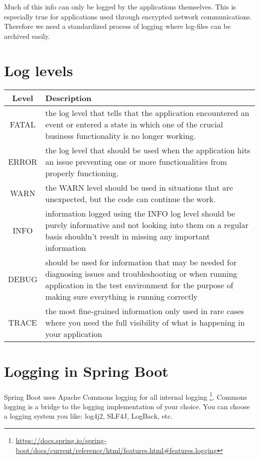 Much of this info can only be logged by the applications themselves. This is especially true for applications used through encrypted network communications. Therefore we need a standardized process of logging where log-files can be archived easily.

\section{Log levels}

\begin{tabular}{|c|p{12cm}|}
\hline
Level & Description \\
\hline
FATAL & the log level that tells that the application encountered an event or entered a state in which one of the crucial business functionality is no longer working. \\

ERROR &  the log level that should be used when the application hits an issue preventing one or more functionalities from properly functioning.\\

WARN & the WARN level should be used in situations that are unexpected, but the code can continue the work. \\

INFO & information logged using the INFO log level should be purely informative and not looking into them on a regular basis shouldn’t result in missing any important information\\

DEBUG & should be used for information that may be needed for diagnosing issues and troubleshooting or when running application in the test environment for the purpose of making sure everything is running correctly \\

TRACE &  the most fine-grained information only used in rare cases where you need the full visibility of what is happening in your application \\
\hline
\end{tabular}

\section{Logging in Spring Boot}

Spring Boot uses Apache Commons logging for all internal logging \footnote{\url{https://docs.spring.io/spring-boot/docs/current/reference/html/features.html\#features.logging}}. Commons logging is a bridge to the logging implementation of your choice. You can choose a logging system you like: log4j2, SLF4J, LogBack, etc.

